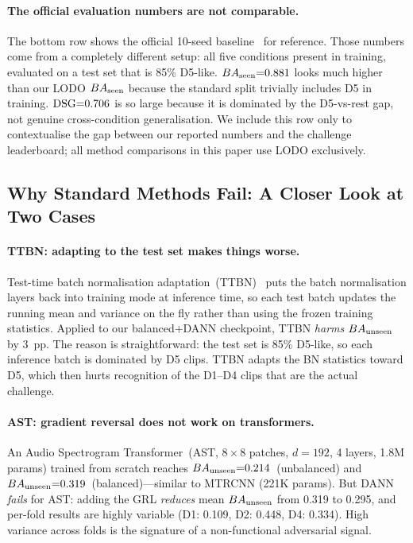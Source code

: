 \paragraph{The official evaluation numbers are not comparable.}
The bottom row shows the official 10-seed baseline~\cite{biodcase2026}
for reference.
Those numbers come from a completely different setup: all five
conditions present in training, evaluated on a test set that is 85\%
D5-like.
$BA_{\text{seen}}{=}0.881$ looks much higher than our LODO $BA_{\text{seen}}$ because the
standard split trivially includes D5 in training.
$\mathrm{DSG}{=}0.706$ is so large because it is dominated by the D5-vs-rest
gap, not genuine cross-condition generalisation.
We include this row only to contextualise the gap between our
reported numbers and the challenge leaderboard; all method
comparisons in this paper use LODO exclusively.

\subsection{Why Standard Methods Fail: A Closer Look at Two Cases}
\label{sec:results:negative}

\paragraph{TTBN: adapting to the test set makes things worse.}
Test-time batch normalisation adaptation~(TTBN)~\cite{tent2021} puts
the batch normalisation layers back into training mode at inference
time, so each test batch updates the running mean and variance on the
fly rather than using the frozen training statistics.
Applied to our balanced+DANN checkpoint, TTBN \emph{harms} $BA_{\text{unseen}}$
by 3~pp.
The reason is straightforward: the test set is 85\% D5-like, so
each inference batch is dominated by D5 clips.
TTBN adapts the BN statistics toward D5, which then hurts recognition
of the D1--D4 clips that are the actual challenge.

\paragraph{AST: gradient reversal does not work on transformers.}
An Audio Spectrogram Transformer~(AST, $8{\times}8$ patches,
$d{=}192$, 4 layers, 1.8M params) trained from scratch reaches
$BA_{\text{unseen}}{=}0.214$~(unbalanced) and $BA_{\text{unseen}}{=}0.319$~(balanced)---similar
to MTRCNN (221K params).
But DANN \emph{fails} for AST: adding the GRL \emph{reduces} mean
$BA_{\text{unseen}}$ from 0.319 to 0.295, and per-fold results are highly
variable (D1: 0.109, D2: 0.448, D4: 0.334).
High variance across folds is the signature of a non-functional
adversarial signal.

